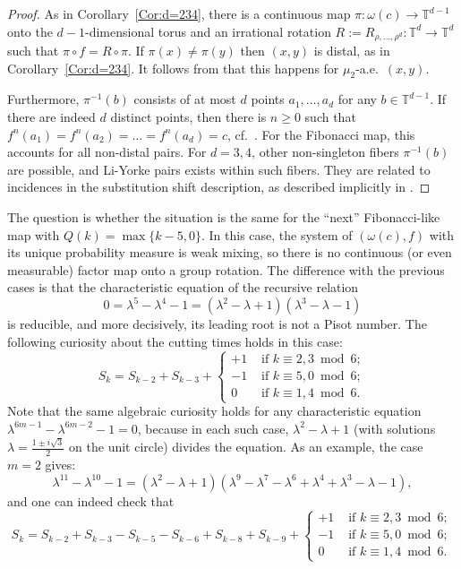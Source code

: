 \documentclass[12pt, psamsfonts, reqno]{amsart}
\begin{document}
\begin{proof}
As in Corollary~\ref{Cor:d=234}, there is a continuous map
$\pi:\omega(c) \to {{\mathbb T}}^{d-1}$ onto the $d-1$-dimensional torus and
an irrational rotation $R := R_{\rho, \dots, \rho^d}: {{\mathbb T}}^d \to {{\mathbb T}}^d$ such
that $\pi \circ f = R \circ \pi$.
If $\pi(x) \neq \pi(y)$ then
$(x,y)$ is distal, as in Corollary~\ref{Cor:d=234}.
It follows from \cite{BKS} that this happens for $\mu_2$-a.e.\ $(x,y)$.

Furthermore, $\pi^{-1}(b)$ consists of at most $d$
points $a_1, \dots , a_d$ for any $b \in {{\mathbb T}}^{d-1}$.
If there are indeed $d$ distinct points, then there is $n \geq 0$ such that
$f^n(a_1) = f^n(a_2) = \dots
= f^n(a_d) = c$, cf.\ \cite{Btree}.
For the Fibonacci map, this accounts for all non-distal pairs.
For $d = 3,4$, other non-singleton fibers $\pi^{-1}(b)$ are possible,
and Li-Yorke pairs exists within such fibers.
They are related to incidences in the substitution shift description, as
described implicitly in \cite{BD}.
\end{proof}

The question is whether the situation is the same for the ``next''
Fibonacci-like map with $Q(k) = \max\{ k-5,0 \}$. In this case,
the system of $(\omega(c), f)$ with its unique probability measure
is weak mixing, so there is no continuous (or even measurable)
factor map onto a group rotation. The difference with the
previous cases is that the characteristic equation of the
recursive relation
\[
0 = \lambda^5 - \lambda^4 - 1 =
(\lambda^2-\lambda+1)(\lambda^3-\lambda-1)
\]
is reducible, and more decisively, its leading root is not a
Pisot number. The following curiosity about the cutting times
holds in this case:
\begin{equation}\label{eq5Fib}
S_k = S_{k-2} + S_{k-3} + \left\{
\begin{array}{rl}
+ 1 & \text{ if } k \equiv 2,3 \bmod 6; \\
- 1 & \text{ if } k \equiv 5,0 \bmod 6; \\
  0 & \text{ if } k \equiv 1,4 \bmod 6.
\end{array} \right.
\end{equation}
Note that the same algebraic
curiosity holds for any characteristic equation $\lambda^{6m-1} -
\lambda^{6m-2} - 1 = 0$, because in each such case,
$\lambda^2-\lambda+1$ (with solutions $\lambda = \frac{1\pm
i\sqrt{3}}{2}$ on the unit circle) divides the equation. As an
example, the case $m=2$ gives:
\[
\lambda^{11} - \lambda^{10} - 1 = (\lambda^2-\lambda+1)
(\lambda^9-\lambda^7 - \lambda^6 + \lambda^4 +
\lambda^3-\lambda-1),
\]
and one can indeed check that
\[
S_k = S_{k-2} + S_{k-3} - S_{k-5} - S_{k-6} + S_{k-8} + S_{k-9}
 + \left\{
\begin{array}{rl}
+ 1 & \text{ if } k \equiv 2,3 \bmod 6; \\
- 1 & \text{ if } k \equiv 5,0 \bmod 6; \\
  0 & \text{ if } k \equiv 1,4 \bmod 6.
\end{array} \right.
\]
\end{document}
